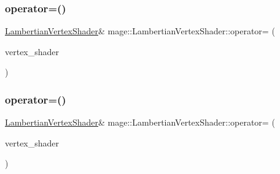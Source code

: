 \subsubsection{\texorpdfstring{operator=()}{operator=()}\hspace{0.1cm}{\footnotesize\ttfamily [1/2]}}
{\footnotesize\ttfamily \hyperlink{classmage_1_1_lambertian_vertex_shader}{Lambertian\+Vertex\+Shader}\& mage\+::\+Lambertian\+Vertex\+Shader\+::operator= (\begin{DoxyParamCaption}\item[{const \hyperlink{classmage_1_1_lambertian_vertex_shader}{Lambertian\+Vertex\+Shader} \&}]{vertex\+\_\+shader }\end{DoxyParamCaption})\hspace{0.3cm}{\ttfamily [delete]}}

\hypertarget{classmage_1_1_lambertian_vertex_shader_ae0a53e712856923403c1f7542941df6e}{}\label{classmage_1_1_lambertian_vertex_shader_ae0a53e712856923403c1f7542941df6e} 
\subsubsection{\texorpdfstring{operator=()}{operator=()}\hspace{0.1cm}{\footnotesize\ttfamily [2/2]}}
{\footnotesize\ttfamily \hyperlink{classmage_1_1_lambertian_vertex_shader}{Lambertian\+Vertex\+Shader}\& mage\+::\+Lambertian\+Vertex\+Shader\+::operator= (\begin{DoxyParamCaption}\item[{\hyperlink{classmage_1_1_lambertian_vertex_shader}{Lambertian\+Vertex\+Shader} \&\&}]{vertex\+\_\+shader }\end{DoxyParamCaption})\hspace{0.3cm}{\ttfamily [delete]}}

\hypertarget{classmage_1_1_lambertian_vertex_shader_a62e3902fb931cddefd94e117e20d190b}{}\label{classmage_1_1_lambertian_vertex_shader_a62e3902fb931cddefd94e117e20d190b} 
